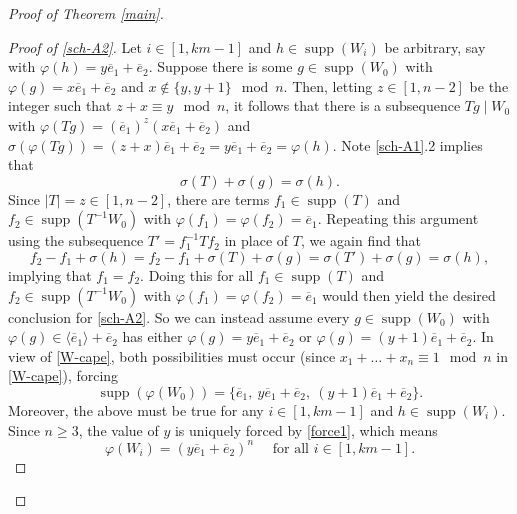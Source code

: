 \documentclass[11pt]{amsart}
\theoremstyle{definition}
\DeclareMathOperator{\supp}{supp}
\newcommand{\la}{\langle}
\newcommand{\ra}{\rangle}
\newcommand{\be}{\begin{equation}}
\newcommand{\ee}{\end{equation}}
\numberwithin{equation}{section}
\begin{document}
\begin{proof}[Proof of Theorem \ref{main}]
\begin{proof}[Proof of \ref{sch-A2}]
		Let $i\in [1,km-1]$ and $h\in \supp(W_i)$ be arbitrary, say with $\varphi(h)=y\overline e_1+\overline e_2$. Suppose there is some $g\in \supp(W_0)$ with $\varphi(g)=x\overline e_1+\overline e_2$ and $x\notin \{y,y+1\}\mod n$. Then, letting $z\in [1,n-2]$ be the integer such that $z+x\equiv y\mod n$, it follows that there is  a subsequence $T g\mid W_0$ with $\varphi(T g)=(\overline e_1)^z (x\overline e_1+\overline e_2)$ and $\sigma(\varphi(T g))=(z+x)\overline e_1+\overline e_2=y\overline e_1+\overline e_2=\varphi(h)$.
		Note \ref{sch-A1}.2 implies that $$\sigma(T)+\sigma(g)=\sigma(h).$$ Since $|T|=z\in [1,n-2]$, there are terms $f_1\in \supp(T)$ and $f_2\in \supp(T^{-1} W_0)$ with $\varphi(f_1)=\varphi(f_2)=\overline e_1$.
		Repeating this argument using the subsequence $T'=f_1^{-1} T f_2$ in place of $T$, we again find that $$f_2-f_1+\sigma(h)=f_2-f_1+\sigma(T)+\sigma(g)=\sigma(T')+\sigma(g)=\sigma(h),$$ implying that $f_1=f_2$. Doing this for all $f_1\in \supp(T)$ and $f_2\in \supp(T^{-1} W_0)$ with $\varphi(f_1)=\varphi(f_2)=\overline e_1$ would then yield the desired conclusion for \ref{sch-A2}. So we can instead assume every $g\in\supp(W_0)$ with $\varphi(g)\in \la \overline e_1\ra+\overline e_2$ has either $\varphi(g)=y\overline e_1+\overline e_2$ or
		$\varphi(g)=(y+1)\overline e_1+\overline e_2$. In view of \eqref{W-cape}, both possibilities must occur (since $x_1+\ldots+x_n\equiv 1\mod n$ in \eqref{W-cape}), forcing \be\label{force1}\supp(\varphi(W_0))=\{\overline e_1,\ y\overline e_1+\overline e_2, \ (y+1)\overline e_1+\overline e_2\}.\ee
		Moreover, the above must be true for any $i\in [1,km-1]$ and $h\in \supp(W_i)$. Since $n\geq 3$, the value of $y$ is uniquely forced by \eqref{force1}, which means  \be\label{morgor}\varphi(W_i)=(y\overline e_1+\overline e_2)^n\quad\mbox{ for all $i\in [1,km-1]$}.\ee
		

\end{proof}
\end{proof}
\end{document}
